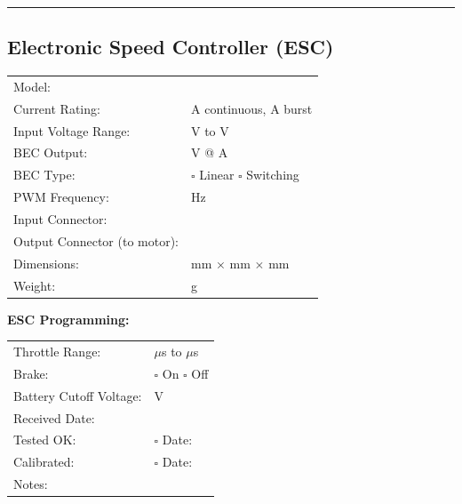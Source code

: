 \documentclass[10pt,letterpaper]{article}
\begin{document}
\vspace{0.5em}
\hrule
\vspace{0.5em}

\subsection*{Electronic Speed Controller (ESC)}
\begin{tabularx}{\textwidth}{lX}
Model: & \underline{\hspace{8cm}} \\
Current Rating: & \underline{\hspace{3cm}} A continuous, \underline{\hspace{3cm}} A burst \\
Input Voltage Range: & \underline{\hspace{3cm}} V to \underline{\hspace{3cm}} V \\
BEC Output: & \underline{\hspace{3cm}} V @ \underline{\hspace{3cm}} A \\
BEC Type: & $\square$ Linear \quad $\square$ Switching \\
PWM Frequency: & \underline{\hspace{4cm}} Hz \\
Input Connector: & \underline{\hspace{4cm}} \\
Output Connector (to motor): & \underline{\hspace{6cm}} \\
Dimensions: & \underline{\hspace{2cm}} mm $\times$ \underline{\hspace{2cm}} mm $\times$ \underline{\hspace{2cm}} mm \\
Weight: & \underline{\hspace{4cm}} g \\
\end{tabularx}

\textbf{ESC Programming:}
\begin{tabularx}{\textwidth}{lX}
Throttle Range: & \underline{\hspace{3cm}} $\mu$s to \underline{\hspace{3cm}} $\mu$s \\
Brake: & $\square$ On \quad $\square$ Off \\
Battery Cutoff Voltage: & \underline{\hspace{4cm}} V \\[0.5em]
Received Date: & \underline{\hspace{4cm}} \\
Tested OK: & $\square$ \quad Date: \underline{\hspace{3cm}} \\
Calibrated: & $\square$ \quad Date: \underline{\hspace{3cm}} \\
Notes: & \underline{\hspace{10cm}} \\
\end{tabularx}
\end{document}
